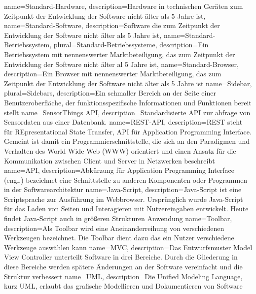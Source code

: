 {
	name=Standard-Hardware,
	description={Hardware in technischen Geräten zum Zeitpunkt der Entwicklung der Software nicht älter als 5 Jahre ist},
}
{
	name=Standard-Software,
	description={Software die zum Zeitpunkt der Entwicklung der Software nicht älter als 5 Jahre ist},
}
{
	name=Standard-Betriebssystem,
	plural=Standard-Betriebssysteme,
	description={Ein Betriebssystem mit nennenswerter Marktbeteiligung, das zum Zeitpunkt der Entwicklung der Software nicht älter al 5 Jahre ist},
}
{
	name=Standard-Browser,
	description={Ein Browser mit nennenswerter Marktbeteiligung, das zum Zeitpunkt der Entwicklung der Software nicht älter als 5 Jahre ist}
}
{
	name=Sidebar,
	plural=Sidebars,
	description={Ein schmaller Bereich an der Seite einer Benutzeroberfläche, der funktionsspezifische Informationen und Funktionen bereit stellt}
}
{
	name=SensorThings \gls{API},
	description={Standardisierte \gls{API} zur abfrage von \gls{Sensor}daten aus einer Datenbank.}
}
{
	name=REST-\gls{API},
	description={REST steht für REpresentational State Transfer, API für Application Programming Interface. Gemeint ist damit ein Programmierschnittstelle, die sich an den Paradigmen und Verhalten des World Wide Web (WWW) orientiert und einen Ansatz für die Kommunikation zwischen Client und Server in Netzwerken beschreibt}
}
{
	name=API,
	description={Abkürzung für Application Programming Interface (engl.) bezeichnet eine Schnittstelle zu anderen Komponenten oder Programmen in der Softwarearchitektur}
}
{
	name=Java-Script,
	description={Java-Script ist eine Scriptsprache zur Ausführung im Webbrowser. Ursprünglich wurde Java-Script für das Laden von Seiten und Interagieren mit Nutzereingaben entwickelt. Heute findet Java-Script auch in größeren Strukturen Anwendung}
}
{
	name=Toolbar,
	description={Als Toolbar wird eine Aneinanderreihung von verschiedenen Werkzeugen bezeichnet. Die Toolbar dient dazu das ein Nutzer verschiedene Werkzeuge auswählen kann}
}
{
	name=MVC,
	description={Das Entwurfsmuster Model View Controller unterteilt Software in drei Bereiche. Durch die Gliederung in diese Bereiche werden spätere Änderungen an der Software vereinfacht und die Struktur verbessert}
}
{
	name=UML,
	description={Die Unified Modeling Language, kurz UML, erlaubt das grafische Modellieren und Dokumentieren von Software}
}
